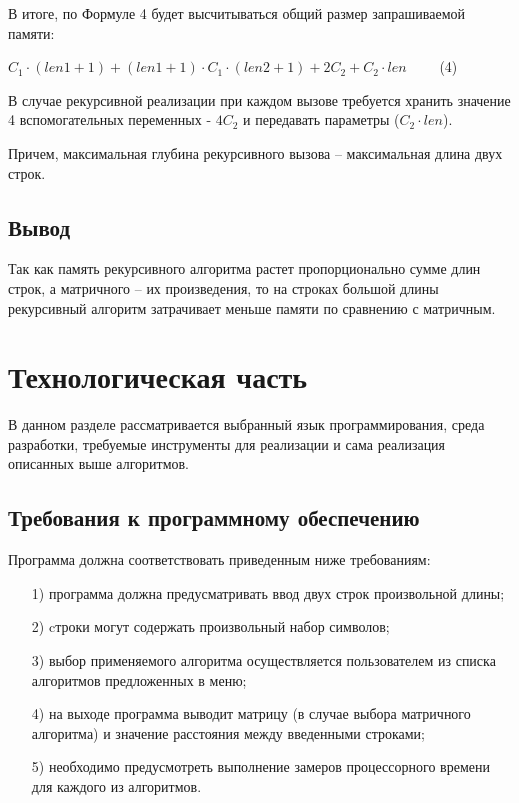 \documentclass[12pt]{report}
\begin{document}
В итоге, по Формуле 4 будет высчитываться общий размер запрашиваемой памяти:\par
$C_1 \cdot (len1 + 1) + (len1 + 1) \cdot C_1 \cdot (len2 + 1) + 2C_2 + C_2 \cdot len \qquad$ (4)

В случае рекурсивной реализации при каждом вызове требуется хранить значение 4 вспомогательных переменных - $4C_2$ 
и передавать параметры ($C_2 \cdot len$).

Причем, максимальная глубина рекурсивного вызова – максимальная длина двух строк.

\section*{Вывод}
Так как память рекурсивного алгоритма растет пропорционально сумме длин строк, а
матричного – их произведения, то на строках большой длины рекурсивный алгоритм затрачивает меньше памяти по сравнению с матричным.

\chapter{Технологическая часть}
В данном разделе рассматривается выбранный язык программирования, среда разработки, требуемые инструменты для реализации и сама реализация описанных выше алгоритмов.


\section{Требования к программному обеспечению}
Программа должна соответствовать приведенным ниже требованиям:
\begin{enumerate}
	\item[1)]  программа должна предусматривать ввод двух строк произвольной длины;
	\item[2)] cтроки могут содержать произвольный набор символов;
	\item[3)] выбор применяемого алгоритма осуществляется пользователем из списка алгоритмов
	предложенных в меню;
	\item[4)] на выходе программа выводит матрицу (в случае выбора матричного алгоритма) и
	значение расстояния между введенными строками;
	\item[5)] необходимо предусмотреть выполнение замеров процессорного времени для
	каждого из алгоритмов.

\end{enumerate}
\end{document}
